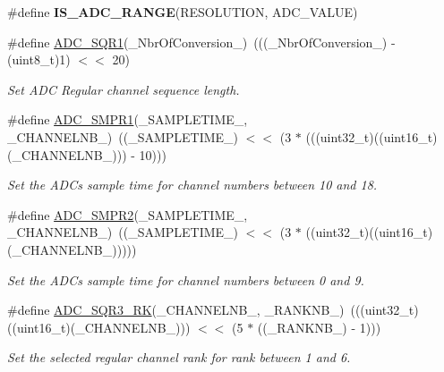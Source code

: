 \begin{DoxyCompactItemize}
\item 
\#define {\bfseries I\+S\+\_\+\+A\+D\+C\+\_\+\+R\+A\+N\+GE}(R\+E\+S\+O\+L\+U\+T\+I\+ON,  A\+D\+C\+\_\+\+V\+A\+L\+UE)
\item 
\#define \hyperlink{group___a_d_c___private___macros_ga1958741688a480069df9ab5e15be93ca}{A\+D\+C\+\_\+\+S\+Q\+R1}(\+\_\+\+Nbr\+Of\+Conversion\+\_\+)~(((\+\_\+\+Nbr\+Of\+Conversion\+\_\+) -\/ (uint8\+\_\+t)1) $<$$<$ 20)
\begin{DoxyCompactList}\small\item\em Set A\+DC Regular channel sequence length. \end{DoxyCompactList}\item 
\#define \hyperlink{group___a_d_c___private___macros_ga29f7414128fbbdb81db6ea6ede449f4b}{A\+D\+C\+\_\+\+S\+M\+P\+R1}(\+\_\+\+S\+A\+M\+P\+L\+E\+T\+I\+M\+E\+\_\+,  \+\_\+\+C\+H\+A\+N\+N\+E\+L\+N\+B\+\_\+)~((\+\_\+\+S\+A\+M\+P\+L\+E\+T\+I\+M\+E\+\_\+) $<$$<$ (3 $\ast$ (((uint32\+\_\+t)((uint16\+\_\+t)(\+\_\+\+C\+H\+A\+N\+N\+E\+L\+N\+B\+\_\+))) -\/ 10)))
\begin{DoxyCompactList}\small\item\em Set the A\+DC\textquotesingle{}s sample time for channel numbers between 10 and 18. \end{DoxyCompactList}\item 
\#define \hyperlink{group___a_d_c___private___macros_gaeb66714538d978d4d336a4a6ef0d58bc}{A\+D\+C\+\_\+\+S\+M\+P\+R2}(\+\_\+\+S\+A\+M\+P\+L\+E\+T\+I\+M\+E\+\_\+,  \+\_\+\+C\+H\+A\+N\+N\+E\+L\+N\+B\+\_\+)~((\+\_\+\+S\+A\+M\+P\+L\+E\+T\+I\+M\+E\+\_\+) $<$$<$ (3 $\ast$ ((uint32\+\_\+t)((uint16\+\_\+t)(\+\_\+\+C\+H\+A\+N\+N\+E\+L\+N\+B\+\_\+)))))
\begin{DoxyCompactList}\small\item\em Set the A\+DC\textquotesingle{}s sample time for channel numbers between 0 and 9. \end{DoxyCompactList}\item 
\#define \hyperlink{group___a_d_c___private___macros_ga173aa2d3480ddaac12fe6a853bead899}{A\+D\+C\+\_\+\+S\+Q\+R3\+\_\+\+RK}(\+\_\+\+C\+H\+A\+N\+N\+E\+L\+N\+B\+\_\+,  \+\_\+\+R\+A\+N\+K\+N\+B\+\_\+)~(((uint32\+\_\+t)((uint16\+\_\+t)(\+\_\+\+C\+H\+A\+N\+N\+E\+L\+N\+B\+\_\+))) $<$$<$ (5 $\ast$ ((\+\_\+\+R\+A\+N\+K\+N\+B\+\_\+) -\/ 1)))
\begin{DoxyCompactList}\small\item\em Set the selected regular channel rank for rank between 1 and 6. \end{DoxyCompactList}\item 

\end{DoxyCompactItemize}
